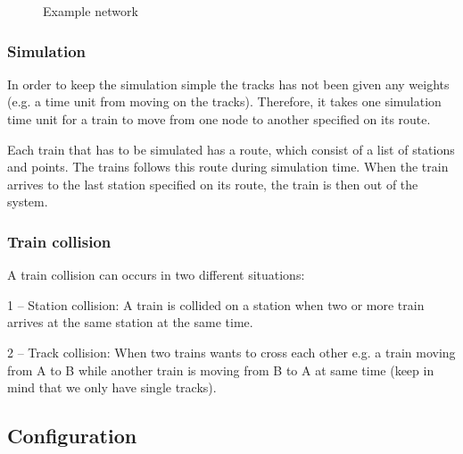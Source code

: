 \documentclass[10pt,a4paper]{article}
\begin{document}
\begin{figure}[h]
\centering
{}
 \caption{Example network}

 \label{fig:graph}
\end{figure}

\subsubsection{Simulation}
 
In order to keep the simulation simple the tracks has not been given any weights (e.g. a time unit from moving on the tracks). Therefore, it takes one simulation time unit for a train to move from one node to another specified on its route.
 
Each train that has to be simulated has a route, which consist of a list of stations and points. The trains follows this route during simulation time. When the train arrives to the last station specified on its route, the train is then out of the system.
 
\subsubsection{Train collision}
 
A train collision can occurs in two different situations:
 
1 – Station collision:
A train is collided on a station when two or more train arrives at the same station at the same time.
 
2 – Track collision:
When two trains wants to cross each other e.g. a train moving from A to B while another train is moving from B to A at same time (keep in mind that we only have single tracks).


\subsection{Configuration}
 
\end{document}
